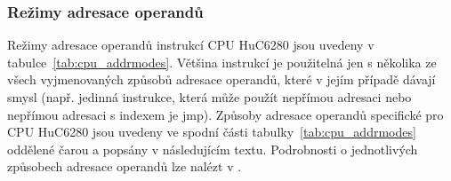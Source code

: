 \newpage


\subsubsection{Režimy adresace operandů}\label{chap:spec_hw_cpu_addr}

Režimy adresace operandů instrukcí CPU HuC6280 jsou uvedeny v
tabulce~\ref{tab:cpu_addrmodes}. Většina instrukcí je použitelná jen s
několika ze všech vyjmenovaných způsobů adresace operandů, které v jejím
případě dávají smysl (např. jedinná instrukce, která může použít nepřímou
adresaci nebo nepřímou adresaci s indexem je {\sc jmp}). Způsoby adresace
operandů specifické pro CPU HuC6280 jsou uvedeny ve spodní části
tabulky~\ref{tab:cpu_addrmodes} oddělené čarou a popsány v následujícím textu.
Podrobnosti o jednotlivých způsobech adresace operandů lze nalézt v
\cite{www65c02, Ormston06}.

